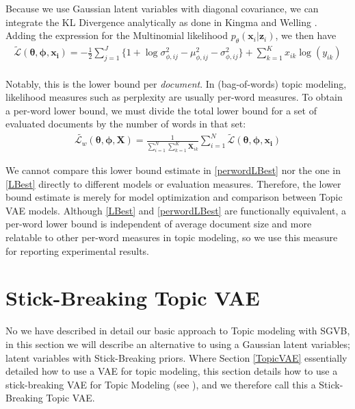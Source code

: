 \documentclass{report}
\begin{document}
Because we use Gaussian latent variables with diagonal covariance, we can integrate the KL Divergence analytically as done in Kingma and Welling \cite{kingma2013auto}. Adding the expression for the Multinomial likelihood $p_\theta(\mathbf{x}_i|\mathbf{z}_i)$, we then have
\begin{align}\label{LBest}
\tilde{\mathcal{L}}(\boldsymbol{\theta}, \boldsymbol{\phi}, \mathbf{x_i}) = - \frac{1}{2}\sum\limits_{j=1}^{J}\{1+\log \sigma_{\phi ,ij}^2 - \mu_{\phi,ij}^2 - \sigma_{\phi ,ij}^2\}  + 
\sum_{k=1}^K x_{ik} \log (y_{ik})
\end{align}
\\
Notably, this is the lower bound per \textit{document}. In (bag-of-words) topic modeling, likelihood measures such as perplexity are usually per-word measures. To obtain a per-word lower bound, we must divide the total lower bound for a set of evaluated documents by the number of words in that set: 
\begin{align}\label{perwordLBest}
\tilde{\mathcal{L}_w}(\boldsymbol{\theta}, \boldsymbol{\phi}, \mathbf{X}) = \frac{1}{\sum\limits_{i=1}^{N}\sum\limits_{k=1}^{K}\mathbf{X}_{ik}}\sum\limits_{i=1}^N \tilde{\mathcal{L}}(\boldsymbol{\theta}, \boldsymbol{\phi}, \mathbf{x_i})
\end{align}

We cannot compare this lower bound estimate in \ref{perwordLBest} nor the one in \ref{LBest} directly to different models or evaluation measures. Therefore, the lower bound estimate is merely for model optimization and comparison between Topic VAE models. Although \ref{LBest} and \ref{perwordLBest} are functionally equivalent, a per-word lower bound is independent of average document size and more relatable to other per-word measures in topic modeling, so we use this measure for reporting experimental results.



\section{Stick-Breaking Topic VAE}
No we have described in detail our basic approach to Topic modeling with SGVB, in this section we will describe an alternative to using a Gaussian latent variables; latent variables with Stick-Breaking priors. Where Section \ref{TopicVAE} essentially detailed how to use a VAE for topic modeling, this section details how to use a stick-breaking VAE for Topic Modeling (see \cite{nalisnick2016deep}), and we therefore call this a Stick-Breaking Topic VAE.\\
\end{document}
